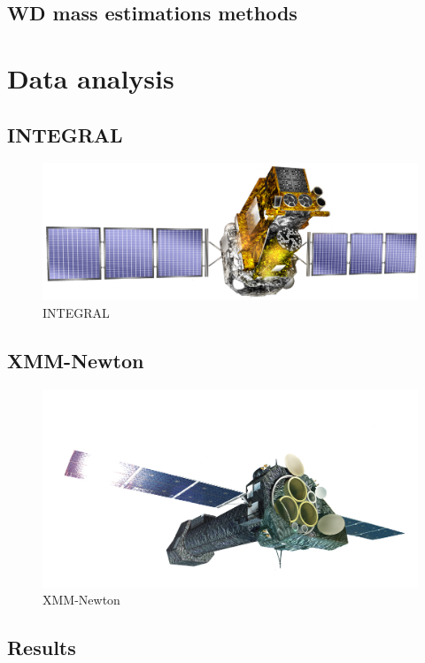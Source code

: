 \documentclass[oneside,a4paper,11pt]{report}
\begin{document}
\section{WD mass estimations methods}

\chapter{Data analysis}

\section{INTEGRAL}

\begin{figure}[!hbt]
\centering
\includegraphics[totalheight=4cm]{integral}
\caption{INTEGRAL}
\label{microblazar} 
\end{figure}


\section{XMM-Newton}

\begin{figure}[!hbt]
\centering
\includegraphics[totalheight=6cm]{XMM}
\caption{XMM-Newton }
\label{microblazar} 
\end{figure}


\section{Results}
\end{document}

